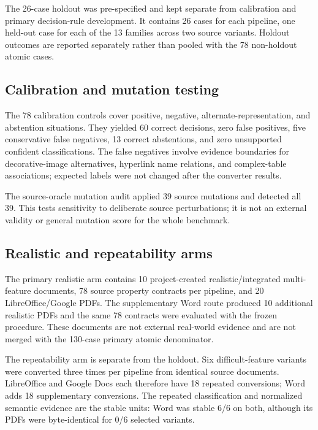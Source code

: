 The 26-case holdout was pre-specified and kept separate from calibration and primary decision-rule development. It contains 26 cases for each pipeline, one held-out case for each of the 13 families across two source variants. Holdout outcomes are reported separately rather than pooled with the 78 non-holdout atomic cases.

\subsection{Calibration and mutation testing}
The 78 calibration controls cover positive, negative, alternate-representation, and abstention situations. They yielded 60 correct decisions, zero false positives, five conservative false negatives, 13 correct abstentions, and zero unsupported confident classifications. The false negatives involve evidence boundaries for decorative-image alternatives, hyperlink name relations, and complex-table associations; expected labels were not changed after the converter results.

The source-oracle mutation audit applied 39 source mutations and detected all 39. This tests sensitivity to deliberate source perturbations; it is not an external validity or general mutation score for the whole benchmark.

\subsection{Realistic and repeatability arms}
The primary realistic arm contains 10 project-created realistic/integrated multi-feature documents, 78 source property contracts per pipeline, and 20 LibreOffice/Google PDFs. The supplementary Word route produced 10 additional realistic PDFs and the same 78 contracts were evaluated with the frozen procedure. These documents are not external real-world evidence and are not merged with the 130-case primary atomic denominator.

The repeatability arm is separate from the holdout. Six difficult-feature variants were converted three times per pipeline from identical source documents. LibreOffice and Google Docs each therefore have 18 repeated conversions; Word adds 18 supplementary conversions. The repeated classification and normalized semantic evidence are the stable units: Word was stable 6/6 on both, although its PDFs were byte-identical for 0/6 selected variants.

